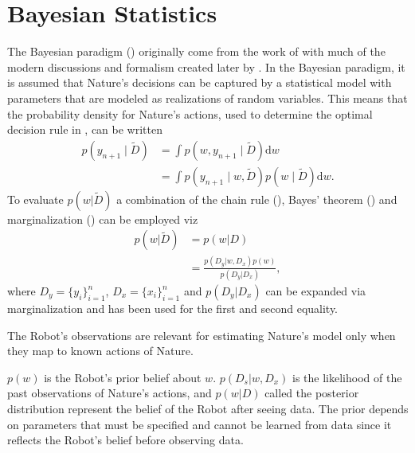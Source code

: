 \section{Bayesian Statistics}
The Bayesian paradigm () originally come from the work of \citet{Bayes:63,laplace_thorie_1812} with much of the modern discussions and formalism created later by \citet{Finetti1937LaP,Jeffreys1940,Savage1954}.\newline
In the Bayesian paradigm, it is assumed that Nature's decisions can be captured by a statistical model with parameters that are modeled as realizations of random variables. This means that the probability density for Nature's actions, used to determine the optimal decision rule in , can be written
\begin{equation}
	\begin{split}
		p(y_{n+1}\mid \tilde{D}) &= \int p(w,y_{n+1}\mid \tilde{D}) \mathrm{d}w\\
		& = \int p(y_{n+1}\mid w,\tilde{D})p(w\mid \tilde{D}) \mathrm{d}w.
	\end{split}
	\label{eq:hest1}
\end{equation}
To evaluate $p(w|\tilde{D})$ a combination of the chain rule (), Bayes' theorem () and marginalization () can be employed viz
\begin{equation}
	\begin{split}
		p(w|\tilde{D}) &= p(w|D)\\
		&= \frac{p(D_y|w,D_x)p(w)}{p(D_y|D_x)},
	\end{split}
	\label{eq:pa2}
\end{equation}
where $D_y= \{y_i\}_{i=1}^n$, $D_x = \{x_i\}_{i=1}^n$ and $p(D_y|D_x)$ can be expanded via marginalization and  has been used for the first and second equality.

\begin{axiom}
	\label{ax:observation_relevance}
	The Robot's observations are relevant for estimating Nature's model only when they map to known actions of Nature.
\end{axiom}

$p(w)$ is the Robot's prior belief about $w$. $p(D_s|w,D_x)$ is the likelihood of the past observations of Nature's actions, and $p(w|D)$ called the posterior distribution represent the belief of the Robot after seeing data. The prior depends on parameters that must be specified and cannot be learned from data since it reflects the Robot's belief before observing data.

